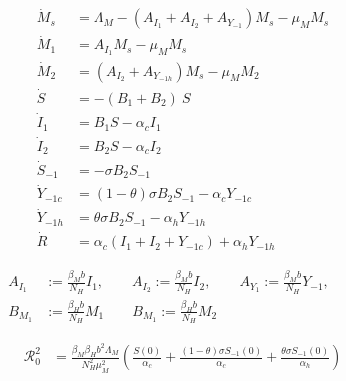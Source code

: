 \begin{equation}
	\begin{aligned}
		\dot{M}_s &= \Lambda_M - (A_{I_1} + A_{I_2} + A_{Y_{-1}}) M_s -
			\mu_M M_s
		\\
		\dot{M}_1 &= A_{I_1} M_s -\mu_M M_s
		\\
		\dot{M}_2 &=(A_{I_2} + A_{Y_{-1h}}) M_s - \mu_M M_2
		\\
		\dot{S} &= -(B_1 + B_2)  ~ S
		\\
		\dot{I}_1 &= B_1  S - \alpha_c I_1
		\\
		\dot{I}_2 &= B_2  S - \alpha_c I_2
		\\
		\dot{S}_{-1} &= - \sigma B_2 S_{-1}
		\\
		\dot{Y}_{-1 c} &= (1 - \theta) \sigma B_2 S_{-1} - \alpha_c  Y_{-1c}
		\\
        \dot{Y}_{-1 h} &=  \theta \sigma B_2 S_{-1} - \alpha_h  Y_{-1h}
        \\
		\dot{R} & =
			\alpha_c( I_1 + I_2 + Y_{-1 c}) + \alpha_h Y_{-1 h}
	\end{aligned}
\end{equation}

\begin{equation}
	\begin{aligned}
		A_{I_1} &:= \frac{\beta_M b}{N_H} I_1, \qquad
		A_{I_2} := \frac{\beta_M b}{N_H} I_2, \qquad
		A_{Y_1} := \frac{\beta_M b}{N_H} Y_{-1}, \qquad
		\\
		B_{M_1} &:= \frac{\beta_H b}{N_H} M_1 \qquad 
		B_{M_1} := \frac{\beta_H b}{N_H} M_2
	\end{aligned}
\end{equation}

\begin{equation}
 \begin{aligned}
	 \mathcal{R}_0 ^2 &=
	 	\frac{\beta_M \beta_H b^2 \Lambda_M }{N_H^2 \mu_M^2} 
        \left(
			\frac{S(0)}{\alpha_c}
            +
            \frac{(1 - \theta) \sigma S_{-1}(0)}{\alpha_c}
            +
            \frac{\theta \sigma S_{-1}(0)}{\alpha_h}
        \right)
	\end{aligned}
\end{equation}